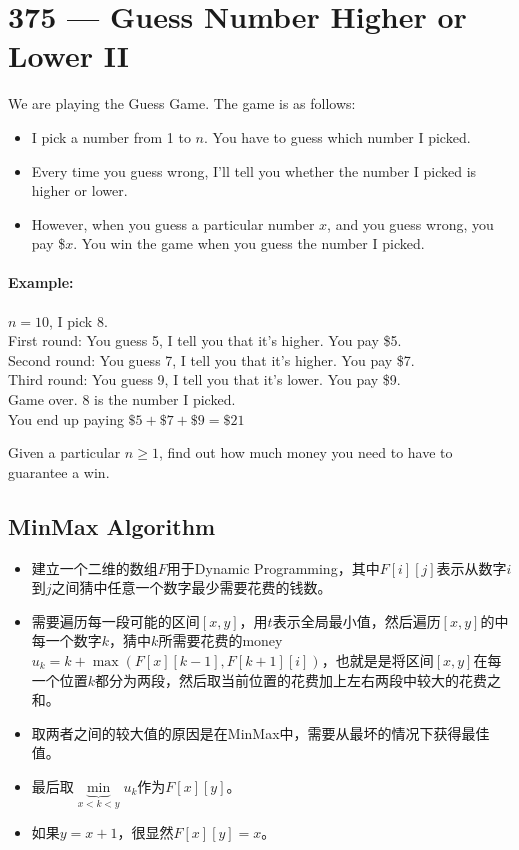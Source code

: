\section{375 --- Guess Number Higher or Lower II}
We are playing the Guess Game. The game is as follows:

\begin{itemize}
\item I pick a number from 1 to $ n $. You have to guess which number I picked.

\item Every time you guess wrong, I'll tell you whether the number I picked is higher or lower.

\item However, when you guess a particular number $ x $, and you guess wrong, you pay \$$x$. You win the game when you guess the number I picked.
\end{itemize}

\paragraph{Example:}

\begin{flushleft}
$ n = 10 $, I pick 8.
\\
First round:  You guess 5, I tell you that it's higher. You pay \$5.
\\
Second round: You guess 7, I tell you that it's higher. You pay \$7.
\\
Third round:  You guess 9, I tell you that it's lower. You pay \$9.
\\
Game over. 8 is the number I picked.
\\
You end up paying $\$5 + \$7 + \$9 = \$21$
\end{flushleft}

Given a particular $n \geq 1$, find out how much money you need to have to guarantee a win.

\subsection{MinMax Algorithm}
\begin{itemize}
\item 建立一个二维的数组$F$用于Dynamic Programming，其中$F[i][j]$表示从数字$i$到$j$之间猜中任意一个数字最少需要花费的钱数。
\item 需要遍历每一段可能的区间$[x, y]$，用$t$表示全局最小值，然后遍历$ [x,y] $的中每一个数字$k$，猜中$k$所需要花费的money $u_k = k + \max(F[x][k - 1], F[k + 1][i])$，也就是是将区间$ [x,y] $在每一个位置$k$都分为两段，然后取当前位置的花费加上左右两段中较大的花费之和。
\item 取两者之间的较大值的原因是在MinMax中，需要从最坏的情况下获得最佳值。
\item 最后取$\underbrace{\min}_{x< k < y}u_k$作为$F[x][y]$。
\item 如果$y=x+1$，很显然$F[x][y]=x$。
\end{itemize}

